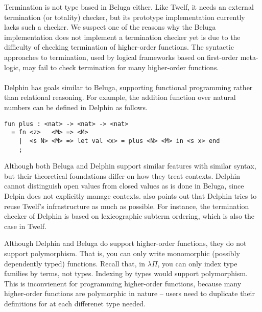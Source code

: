 Termination is not type based in Beluga either. Like Twelf, it needs
an external termination (or totality) checker, but its prototype
implementation currently lacks such a checker.
We suspect one of the reasons why the Beluga implementation does not implement
a termination checker yet is due to the difficulty of checking termination
of higher-order functions. The syntactic approaches to termination,
used by logical frameworks based on first-order meta-logic,
may fail to check termination for many higher-order functions.

\paragraph{}
Delphin \cite{pos08phd} has goals similar to Beluga,
supporting functional programming rather than relational reasoning.
For example, the addition function over natural numbers can be defined
in Delphin as follows.\vspace{-2em}
\begin{singlespace}
\begin{verbatim}
fun plus : <nat> -> <nat> -> <nat> 
  = fn <z>   <M> => <M>
    |  <s N> <M> => let val <x> = plus <N> <M> in <s x> end
    ;
\end{verbatim}
\end{singlespace}\noindent
Although both Beluga and Delphin support similar features with similar syntax,
but their theoretical foundations differ \cite{Pie10} on how they treat contexts.
Delphin cannot distinguish open values from closed values as is done in Beluga,
since Delpin does not explicitly manage contexts.
\citet{Pie10} also points out that Delphin tries to reuse Twelf's infrastructure
as much as possible. For instance, the termination checker of Delphin is
based on lexicographic subterm ordering, which is also the case in Twelf.

Although Delphin and Beluga do support higher-order functions,
they do not support polymorphism. That is, you can only write
monomorphic (possibly dependently typed) functions. Recall that,
in $\lambda\Pi$, you can only index type families by terms, not types.
Indexing by types would support polymorphism.
This is inconvienent for programming higher-order functions,
because many higher-order functions are polymorphic in nature -- users
need to duplicate their definitions for at each differenet type needed.

